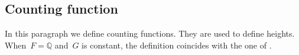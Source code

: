 \documentclass[a4paper,english,12pt]{amsart}
\newcommand{\QQ}{\mathbb{Q}}
\newcommand{\ZZ}{\mathbb{Z}}
\newcommand{\muu}{\boldsymbol{\mu}}
\DeclareMathOperator{\Hom}{Hom}
\DeclareMathOperator{\cycl}{cycl}
\newtheorem{mydef}[equation]{Definition}
\numberwithin{equation}{subsection}
\begin{document}
\subsection{Counting function}
In this paragraph we define counting functions. They are used to define heights. When~$F=\QQ$ and~$G$ is constant, the definition coincides with the one of \cite[Section 4.2]{Gmethodant}. 
\end{document}
